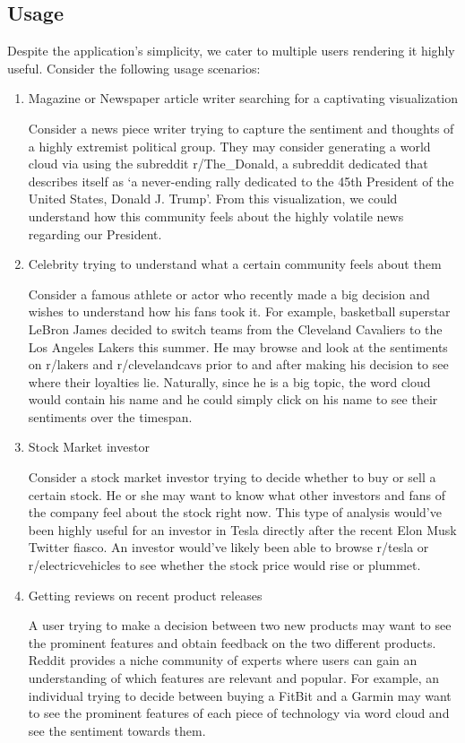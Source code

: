 \documentclass[11pt]{article}
\begin{document}
\subsection{Usage}
\tab Despite the application’s simplicity, we cater to multiple users rendering it highly useful. Consider the following usage scenarios:

\begin{enumerate}

\item{Magazine or Newspaper article writer searching for a captivating visualization}

\par Consider a news piece writer trying to capture the sentiment and thoughts of a highly extremist political group. They may consider generating a world cloud via using the subreddit r/The\_Donald, a subreddit dedicated that describes itself as ‘a never-ending rally dedicated to the 45th President of the United States, Donald J. Trump’. From this visualization, we could understand how this community feels about the highly volatile news regarding our President.

\item{Celebrity trying to understand what a certain community feels about them
}

\par Consider a famous athlete or actor who recently made a big decision and wishes to understand how his fans took it. For example, basketball superstar LeBron James decided to switch teams from the Cleveland Cavaliers to the Los Angeles Lakers this summer. He may browse and look at the sentiments on r/lakers and r/clevelandcavs prior to and after making his decision to see where their loyalties lie. Naturally, since he is a big topic, the word cloud would contain his name and he could simply click on his name to see their sentiments over the timespan.

\item{Stock Market investor}

\par Consider a stock market investor trying to decide whether to buy or sell a certain stock. He or she may want to know what other investors and fans of the company feel about the stock right now. This type of analysis would’ve been highly useful for an investor in Tesla directly after the recent Elon Musk Twitter fiasco. An investor would’ve likely been able to browse r/tesla or r/electricvehicles to see whether the stock price would rise or plummet.

\item{Getting reviews on recent product releases}

\par A user trying to make a decision between two new products may want to see the prominent features and obtain feedback on the two different products. Reddit provides a niche community of experts where users can gain an understanding of which features are relevant and popular. For example, an individual trying to decide between buying a FitBit and a Garmin may want to see the prominent features of each piece of technology via word cloud and see the sentiment towards them.
\end{enumerate}
\end{document}
